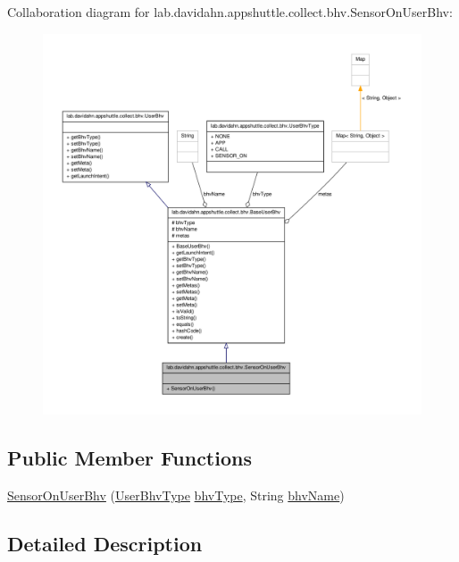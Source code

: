 \-Collaboration diagram for lab.\-davidahn.\-appshuttle.\-collect.\-bhv.\-Sensor\-On\-User\-Bhv\-:
\nopagebreak
\begin{figure}[H]
\begin{center}
\leavevmode
\includegraphics[width=350pt]{classlab_1_1davidahn_1_1appshuttle_1_1collect_1_1bhv_1_1_sensor_on_user_bhv__coll__graph}
\end{center}
\end{figure}
\subsection*{\-Public \-Member \-Functions}
\begin{DoxyCompactItemize}
\item 
\hyperlink{classlab_1_1davidahn_1_1appshuttle_1_1collect_1_1bhv_1_1_sensor_on_user_bhv_a56134658ada0361b898e93243f1571b9}{\-Sensor\-On\-User\-Bhv} (\hyperlink{enumlab_1_1davidahn_1_1appshuttle_1_1collect_1_1bhv_1_1_user_bhv_type}{\-User\-Bhv\-Type} \hyperlink{classlab_1_1davidahn_1_1appshuttle_1_1collect_1_1bhv_1_1_base_user_bhv_a29dae66ba4bf89a75849d77a35a57cb2}{bhv\-Type}, \-String \hyperlink{classlab_1_1davidahn_1_1appshuttle_1_1collect_1_1bhv_1_1_base_user_bhv_aa211c66df8abf7df665859d662891cc0}{bhv\-Name})
\end{DoxyCompactItemize}


\subsection{\-Detailed \-Description}


